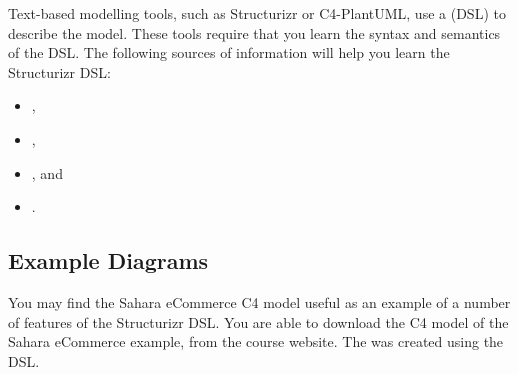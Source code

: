 Text-based modelling tools, such as Structurizr or C4-PlantUML, use a
 (DSL) to describe the model.
These tools require that you learn the syntax and semantics of the DSL.
The following sources of information will help you learn the Structurizr DSL:
\begin{itemize}[nosep]
    \item {},
    \item {}, 
    \item {}, and
    \item {}.
\end{itemize}

\subsection{Example Diagrams}
You may find the Sahara eCommerce C4 model useful as an example of a number of features of the Structurizr DSL.
You are able to download the C4 model of the Sahara eCommerce example, from the course website.
The 
was created using the  DSL.
